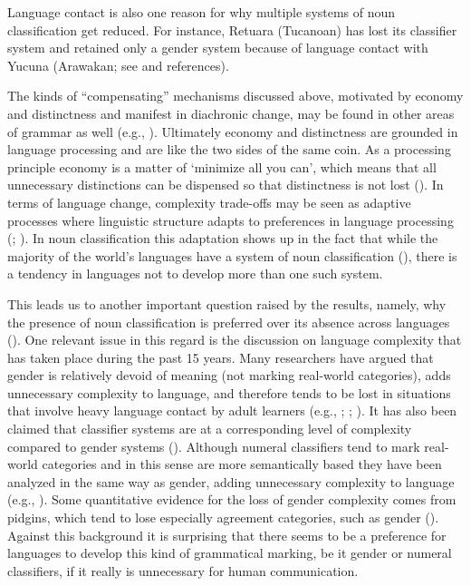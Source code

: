\documentclass[output=collectionpaper]{langsci/langscibook}
\begin{document}
Language contact is also one reason for why multiple systems of noun classification get reduced. For instance, Retuara (Tucanoan) has lost its classifier system and retained only a gender system because of language contact with Yucuna (Arawakan; see \citealt[386]{Aikhenvald2000} and references).

The kinds of ``compensating'' mechanisms discussed above, motivated by economy and distinctness and manifest in diachronic change, may be found in other areas of grammar as well (e.g., \citealt{Sinnemaeki2014}). Ultimately economy and distinctness are grounded in language processing and are like the two sides of the same coin. As a processing principle economy is a matter of `minimize all you can', which means that all unnecessary distinctions can be dispensed so that distinctness is not lost (\citealt{Bornkessel-Schlesewsky2009}). In terms of language change, complexity trade-offs may be seen as adaptive processes where linguistic structure adapts to preferences in language processing (\citealt{Sinnemaeki2014b}; \citealt{Bickel2015}). In noun classification this adaptation shows up in the fact that while the majority of the world's languages have a system of noun classification (), there is a tendency in languages not to develop more than one such system.

This leads us to another important question raised by the results, namely, why the presence of noun classification is preferred over its absence across languages (). One relevant issue in this regard is the discussion on language complexity that has taken place during the past 15 years. Many researchers have argued that gender is relatively devoid of meaning (not marking real-world categories), adds unnecessary complexity to language, and therefore tends to be lost in situations that involve heavy language contact by adult learners (e.g., \citealt[129]{McWhorter2001}; \citealt[25]{Kusters2003}; \citealt[155--166]{Trudgill2011}). It has also been claimed that classifier systems are at a corresponding level of complexity compared to gender systems (\citealt[136--141, 147--148]{Riddle2008}). Although numeral classifiers tend to mark real-world categories \textendash{} and in this sense are more semantically based \textendash{} they have been analyzed in the same way as gender, adding unnecessary complexity to language (e.g., \citealt[22]{McWhorter2007}). Some quantitative evidence for the loss of gender complexity comes from pidgins, which tend to lose especially agreement categories, such as gender (\citealt{Roberts2008}). Against this background it is surprising that there seems to be a preference for languages to develop this kind of grammatical marking, be it gender or numeral classifiers, if it really is unnecessary for human communication.
\end{document}
